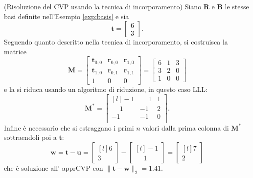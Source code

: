\begin{exmp}(Risoluzione del CVP usando la tecnica di incorporamento)
Siano $\mathbf{R}$ e $\mathbf{B}$ le stesse basi definite nell'Esempio \ref{exp:basis} e
sia
\[
    \mathbf{t} =
    \begin{bmatrix}
        6\\
        3
    \end{bmatrix}.
\]
Seguendo quanto descritto nella tecnica di incorporamento, si costruisca la matrice 
\[
    \mathbf{M} =
    \begin{bmatrix}
        \mathbf{t}_{0,0} & \mathbf{r}_{0,0} & \mathbf{r}_{1,0}\\
        \mathbf{t}_{1,0} & \mathbf{r}_{0,1} & \mathbf{r}_{1,1}\\
        1 & 0 & 0
    \end{bmatrix}
    =
    \begin{bmatrix}
        6 & 1 & 3 \\
        3 & 2 & 0 \\
        1 & 0 & 0 
    \end{bmatrix}
\]
e la si riduca usando un algoritmo di riduzione, in questo caso LLL:
\begin{equation*}
    \mathbf{M}^* =
    \begin{bmatrix*}[l]
        -1           & \phantom{-}1 & 1\\
        \phantom{-}1 & -1           & 2 \\
        -1           & -1           & 0\\
    \end{bmatrix*}.
\end{equation*}
Infine è necessario che si estraggano i primi $n$ valori dalla prima colonna di $\mathbf{M}^*$
sottraendoli poi a $\mathbf{t}$:
\begin{equation*}
    \mathbf{w} = \mathbf{t} - \mathbf{u} =
    \begin{bmatrix*}[l]
        6 \\
        3
    \end{bmatrix*}
    -
    \begin{bmatrix*}[l]
        -1 \\
        \phantom{-}1
    \end{bmatrix*}
    =
    \begin{bmatrix*}[l]
        7 \\
        2
    \end{bmatrix*}
\end{equation*}
che è soluzione all' apprCVP con $\|\mathbf{t}-\mathbf{w}\|_2=1.41$.

\end{exmp}
